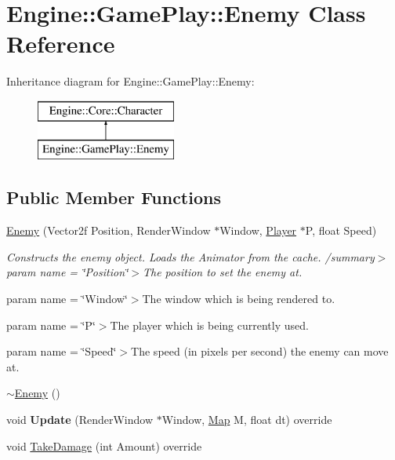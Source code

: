 \hypertarget{class_engine_1_1_game_play_1_1_enemy}{}\section{Engine\+:\+:Game\+Play\+:\+:Enemy Class Reference}
\label{class_engine_1_1_game_play_1_1_enemy}
Inheritance diagram for Engine\+:\+:Game\+Play\+:\+:Enemy\+:\begin{figure}[H]
\begin{center}
\leavevmode
\includegraphics[height=2.000000cm]{class_engine_1_1_game_play_1_1_enemy}
\end{center}
\end{figure}
\subsection*{Public Member Functions}
\begin{DoxyCompactItemize}
\item 
\mbox{\label{class_engine_1_1_game_play_1_1_enemy_aecd83da9f05f6d81d512e56f0f16b1d2}} 
\hyperlink{class_engine_1_1_game_play_1_1_enemy_aecd83da9f05f6d81d512e56f0f16b1d2}{Enemy} (Vector2f Position, Render\+Window $\ast$Window, \hyperlink{class_engine_1_1_game_play_1_1_player}{Player} $\ast$P, float Speed)
\begin{DoxyCompactList}\small\item\em Constructs the enemy object. Loads the Animator from the cache. /summary$>$ param name = \char`\"{}\+Position\char`\"{}$>$The position to set the enemy at.

param name = \char`\"{}\+Window\char`\"{}$>$The window which is being rendered to.

param name = \char`\"{}\+P\char`\"{}$>$The player which is being currently used.

param name = \char`\"{}\+Speed\char`\"{}$>$The speed (in pixels per second) the enemy can move at.\end{DoxyCompactList}\item 
\hyperlink{class_engine_1_1_game_play_1_1_enemy_a4fc3aafb331e8cf852ea31bcc63940ff}{$\sim$\+Enemy} ()
\item 
\mbox{\label{class_engine_1_1_game_play_1_1_enemy_a57b75fc882a4315cfda071dbb5c1b5ea}} 
void {\bfseries Update} (Render\+Window $\ast$Window, \hyperlink{class_engine_1_1_core_1_1_map}{Map} M, float dt) override
\item 
void \hyperlink{class_engine_1_1_game_play_1_1_enemy_a0eec9ea5a61636db10b5f02f9e74189a}{Take\+Damage} (int Amount) override
\end{DoxyCompactItemize}
